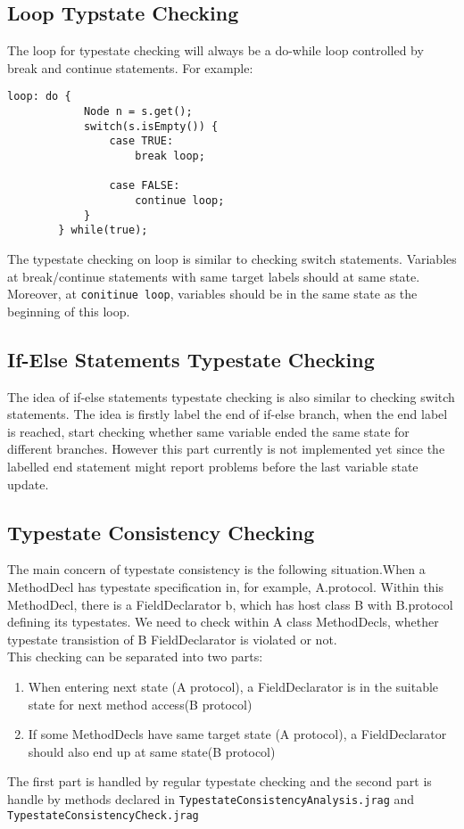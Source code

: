 \documentclass[]{article}
\begin{document}
\subsection{Loop Typstate Checking}
The loop for typestate checking will always be a do-while loop controlled by break and continue statements. For example:
\begin{lstlisting}
loop: do {
			Node n = s.get();
			switch(s.isEmpty()) {
				case TRUE:
					break loop;

				case FALSE:
					continue loop;
			}
		} while(true);
\end{lstlisting}
The typestate checking on loop is similar to checking switch statements. Variables at break/continue statements with same target labels should at same state. Moreover, at \texttt{conitinue loop}, variables should be in the same state as the beginning of this loop.

\subsection{If-Else Statements Typestate Checking}
The idea of if-else statements typestate checking is also similar to checking switch statements. The idea is firstly label the end of if-else branch, when the end label is reached, start checking whether same variable ended the same state for different branches. However this part currently is not implemented yet since the labelled end statement might report problems before the last variable state update.


\subsection{Typestate Consistency Checking}
The main concern of typestate consistency is the following situation.When a MethodDecl has typestate specification in, for example, A.protocol. Within this MethodDecl, there is a FieldDeclarator b, which has host class B with B.protocol defining its typestates. We need to check within A class MethodDecls, whether typestate transistion of B FieldDeclarator is violated or not.\\[0.2cm]
This checking can be separated into two parts:
\begin{enumerate}
	\item When entering next state (A protocol), a FieldDeclarator is in the suitable state for next method access(B protocol)
	\item If some MethodDecls have same target state (A protocol), a FieldDeclarator should also end up at same state(B protocol)
\end{enumerate}
The first part is handled by regular typestate checking and the second part is handle by methods declared in \texttt{TypestateConsistencyAnalysis.jrag} and \texttt{TypestateConsistencyCheck.jrag}
\end{document}

